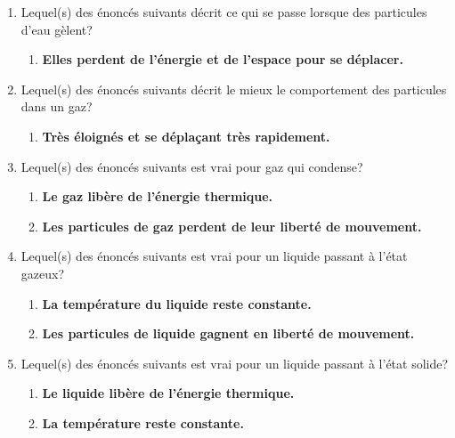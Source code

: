 \documentclass[
  11pt,
  a4paper,
  openany]{book}
\providecommand{\tightlist}{%
  \setlength{\itemsep}{0pt}\setlength{\parskip}{0pt}}
\begin{document}
\begin{Answer}

\begin{enumerate}
\def\labelenumi{\arabic{enumi}.}
\tightlist
\item
  Lequel(s) des énoncés suivants décrit ce qui se passe lorsque des particules d'eau gèlent?

  \begin{enumerate}
  \def\labelenumii{\alph{enumii}.}
  \setcounter{enumii}{3}
  \tightlist
  \item
    \textbf{Elles perdent de l'énergie et de l'espace pour se déplacer.}
  \end{enumerate}
\item
  Lequel(s) des énoncés suivants décrit le mieux le comportement des particules dans un gaz?

  \begin{enumerate}
  \def\labelenumii{\alph{enumii}.}
  \setcounter{enumii}{3}
  \tightlist
  \item
    \textbf{Très éloignés et se déplaçant très rapidement.}
  \end{enumerate}
\item
  Lequel(s) des énoncés suivants est vrai pour gaz qui condense?

  \begin{enumerate}
  \def\labelenumii{\alph{enumii}.}
  \tightlist
  \item
    \textbf{Le gaz libère de l'énergie thermique.}
  \item
    \textbf{Les particules de gaz perdent de leur liberté de mouvement.}
  \end{enumerate}
\item
  Lequel(s) des énoncés suivants est vrai pour un liquide passant à l'état gazeux?

  \begin{enumerate}
  \def\labelenumii{\alph{enumii}.}
  \tightlist
  \item
    \textbf{La température du liquide reste constante.}
  \item
    \textbf{Les particules de liquide gagnent en liberté de mouvement.}
  \end{enumerate}
\item
  Lequel(s) des énoncés suivants est vrai pour un liquide passant à l'état solide?

  \begin{enumerate}
  \def\labelenumii{\alph{enumii}.}
  \tightlist
  \item
    \textbf{Le liquide libère de l'énergie thermique.}
  \item
    \textbf{La température reste constante.}
  \end{enumerate}
\end{enumerate}

\end{Answer}
\end{document}

